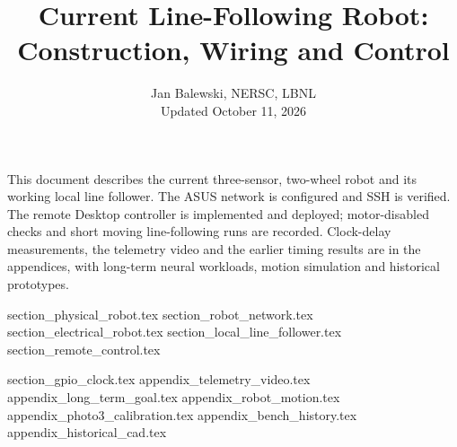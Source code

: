 \documentclass[10pt,journal,compsoc,onecolumn]{IEEEtran}
\begin{document}
\title{Current Line-Following Robot: Construction, Wiring and Control}
\author{Jan Balewski, NERSC, LBNL\\[0.5em]Updated October 11, 2026}
\maketitle

\noindent This document describes the current three-sensor, two-wheel robot and its working local line follower. The ASUS network is configured and SSH is verified. The remote Desktop controller is implemented and deployed; motor-disabled checks and short moving line-following runs are recorded. Clock-delay measurements, the telemetry video and the earlier timing results are in the appendices, with long-term neural workloads, motion simulation and historical prototypes.

\tableofcontents
{section_physical_robot.tex}
{section_robot_network.tex}
{section_electrical_robot.tex}
{section_local_line_follower.tex}
{section_remote_control.tex}

\clearpage
\appendices
{section_gpio_clock.tex}
{appendix_telemetry_video.tex}
{appendix_long_term_goal.tex}
{appendix_robot_motion.tex}
{appendix_photo3_calibration.tex}
{appendix_bench_history.tex}
{appendix_historical_cad.tex}
\end{document}
